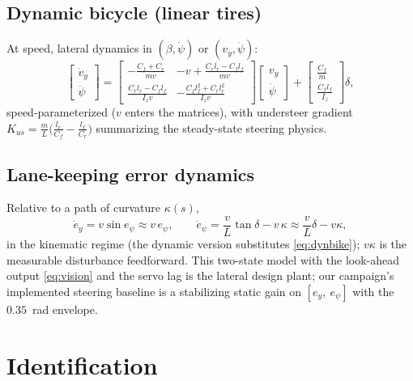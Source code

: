 \documentclass[conference]{IEEEtran}
\begin{document}
\subsection{Dynamic bicycle (linear tires)}
At speed, lateral dynamics in $(\beta, \dot\psi)$ or $(v_y,\dot\psi)$:
\begin{equation}
\begin{bmatrix}\dot v_y\\ \ddot\psi\end{bmatrix} =
\begin{bmatrix}
-\frac{C_f+C_r}{m v} & -v + \frac{C_r l_r - C_f l_f}{m v}\\[3pt]
\frac{C_r l_r - C_f l_f}{I_z v} & -\frac{C_f l_f^2 + C_r l_r^2}{I_z v}
\end{bmatrix}
\begin{bmatrix}v_y\\ \dot\psi\end{bmatrix}
+
\begin{bmatrix}\frac{C_f}{m}\\[2pt] \frac{C_f l_f}{I_z}\end{bmatrix}\delta,
\label{eq:dynbike}
\end{equation}
speed-parameterized ($v$ enters the matrices), with understeer gradient $K_{us} = \frac{m}{L}\bigl(\frac{l_r}{C_f} - \frac{l_f}{C_r}\bigr)$ summarizing the steady-state steering physics.

\subsection{Lane-keeping error dynamics}
Relative to a path of curvature $\kappa(s)$,
\begin{equation}
\dot e_y = v\sin e_\psi \approx v\,e_\psi,
\qquad
\dot e_\psi = \frac{v}{L}\tan\delta - v\,\kappa \approx \frac{v}{L}\delta - v\kappa,
\label{eq:laneerr}
\end{equation}
in the kinematic regime (the dynamic version substitutes \eqref{eq:dynbike}); $v\kappa$ is the measurable disturbance feedforward. This two-state model with the look-ahead output \eqref{eq:vision} and the servo lag is the lateral design plant; our campaign's implemented steering baseline is a stabilizing static gain on $[e_y,\ e_\psi]$ with the $0.35$~rad envelope.

\section{Identification}
\end{document}
